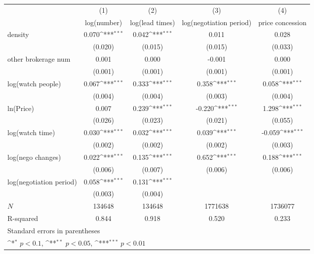 {
\def\sym#1{\ifmmode^{#1}\else\(^{#1}\)\fi}
\begin{tabular}{l*{4}{c}}
\toprule
            &\multicolumn{1}{c}{(1)}&\multicolumn{1}{c}{(2)}&\multicolumn{1}{c}{(3)}&\multicolumn{1}{c}{(4)}\\
            &\multicolumn{1}{c}{log(number)}&\multicolumn{1}{c}{log(lead times)}&\multicolumn{1}{c}{log(negotiation period)}&\multicolumn{1}{c}{price concession}\\
\midrule
density     &       0.070\sym{***}&       0.042\sym{***}&       0.011         &       0.028         \\
            &     (0.020)         &     (0.015)         &     (0.015)         &     (0.033)         \\
\addlinespace
other brokerage num  &       0.001         &       0.000         &      -0.001         &       0.000         \\
            &     (0.001)         &     (0.001)         &     (0.001)         &     (0.001)         \\
\addlinespace
log(watch people)&       0.067\sym{***}&       0.333\sym{***}&       0.358\sym{***}&       0.058\sym{***}\\
            &     (0.004)         &     (0.004)         &     (0.003)         &     (0.004)         \\
\addlinespace
ln(Price)&       0.007         &       0.239\sym{***}&      -0.220\sym{***}&       1.298\sym{***}\\
            &     (0.026)         &     (0.023)         &     (0.021)         &     (0.055)         \\
\addlinespace
log(watch time)&       0.030\sym{***}&       0.032\sym{***}&       0.039\sym{***}&      -0.059\sym{***}\\
            &     (0.002)         &     (0.002)         &     (0.002)         &     (0.003)         \\
\addlinespace
log(nego changes)&       0.022\sym{***}&       0.135\sym{***}&       0.652\sym{***}&       0.188\sym{***}\\
            &     (0.006)         &     (0.007)         &     (0.006)         &     (0.006)         \\
\addlinespace
log(negotiation period)&       0.058\sym{***}&       0.131\sym{***}&                     &                     \\
            &     (0.003)         &     (0.004)         &                     &                     \\
\midrule
\(N\)       &      134648         &      134648         &     1771638         &     1736077         \\
R-squared   &       0.844         &       0.918         &       0.520         &       0.233         \\
\bottomrule
\multicolumn{5}{l}{\footnotesize Standard errors in parentheses}\\
\multicolumn{5}{l}{\footnotesize \sym{*} \(p<0.1\), \sym{**} \(p<0.05\), \sym{***} \(p<0.01\)}\\
\end{tabular}
}

